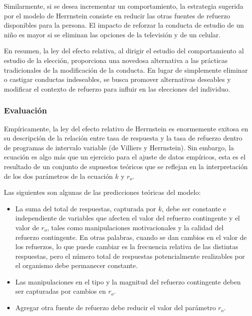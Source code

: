 \documentclass[
  letterpaper,
]{book}
\providecommand{\tightlist}{%
  \setlength{\itemsep}{0pt}\setlength{\parskip}{0pt}}\usepackage{longtable,booktabs,array}
\begin{document}
Similarmente, si se desea incrementar un comportamiento, la estrategia
sugerida por el modelo de Herrnstein consiste en reducir las otras
fuentes de refuerzo disponibles para la persona. El impacto de reforzar
la conducta de estudio de un niño es mayor si se eliminan las opciones
de la televisión y de un celular.

En resumen, la ley del efecto relativa, al dirigir el estudio del
comportamiento al estudio de la elección, proporciona una novedosa
alternativa a las prácticas tradicionales de la modificación de la
conducta. En lugar de simplemente eliminar o castigar conductas
indeseables, se busca promover alternativas deseables y modificar el
contexto de refuerzo para influir en las elecciones del individuo.

\subsubsection{Evaluación}\label{evaluaciuxf3n}

Empíricamente, la ley del efecto relativo de Herrnstein es enormemente
exitosa en su descripción de la relación entre tasa de respuesta y la
tasa de refuerzo dentro de programas de intervalo variable (de Villiers
y Herrnstein). Sin embargo, la ecuación es algo más que un ejercicio
para el ajuste de datos empíricos, esta es el resultado de un conjunto
de supuestos teóricos que se reflejan en la interpretación de los dos
parámetros de la ecuación \(k\) y \(r_o\).

Las siguientes son algunas de las predicciones teóricas del modelo:

\begin{itemize}
\tightlist
\item
  La suma del total de respuestas, capturada por \(k\), debe ser
  constante e independiente de variables que afecten el valor del
  refuerzo contingente y el valor de \(r_o\), tales como manipulaciones
  motivacionales y la calidad del refuerzo contingente. En otras
  palabras, cuando se dan cambios en el valor de los refuerzos, lo que
  puede cambiar es la frecuencia relativa de las distintas respuestas,
  pero el número total de respuestas potencialmente realizables por el
  organismo debe permanecer constante.
\item
  Las manipulaciones en el tipo y la magnitud del refuerzo contingente
  deben ser capturadas por cambios en \(r_o\).
\item
  Agregar otra fuente de refuerzo debe reducir el valor del parámetro
  \(r_o\).
\end{itemize}
\end{document}
